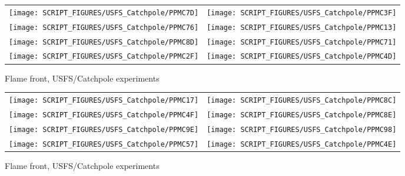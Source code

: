 \begin{figure}[p]
\begin{tabular*}{\textwidth}{l@{\extracolsep{\fill}}r}
\texttt{[image: SCRIPT\_FIGURES/USFS\_Catchpole/PPMC7D]} &
\texttt{[image: SCRIPT\_FIGURES/USFS\_Catchpole/PPMC3F]} \\
\texttt{[image: SCRIPT\_FIGURES/USFS\_Catchpole/PPMC76]} &
\texttt{[image: SCRIPT\_FIGURES/USFS\_Catchpole/PPMC13]} \\
\texttt{[image: SCRIPT\_FIGURES/USFS\_Catchpole/PPMC8D]} &
\texttt{[image: SCRIPT\_FIGURES/USFS\_Catchpole/PPMC71]} \\
\texttt{[image: SCRIPT\_FIGURES/USFS\_Catchpole/PPMC2F]} &
\texttt{[image: SCRIPT\_FIGURES/USFS\_Catchpole/PPMC4D]} \\
\end{tabular*}
\caption[Flame front, USFS/Catchpole experiments]{Flame front, USFS/Catchpole experiments}
\label{USFS_Catchpole_216}
\end{figure}


\begin{figure}[p]
\begin{tabular*}{\textwidth}{l@{\extracolsep{\fill}}r}
\texttt{[image: SCRIPT\_FIGURES/USFS\_Catchpole/PPMC17]} &
\texttt{[image: SCRIPT\_FIGURES/USFS\_Catchpole/PPMC8C]} \\
\texttt{[image: SCRIPT\_FIGURES/USFS\_Catchpole/PPMC4F]} &
\texttt{[image: SCRIPT\_FIGURES/USFS\_Catchpole/PPMC8E]} \\
\texttt{[image: SCRIPT\_FIGURES/USFS\_Catchpole/PPMC9E]} &
\texttt{[image: SCRIPT\_FIGURES/USFS\_Catchpole/PPMC98]} \\
\texttt{[image: SCRIPT\_FIGURES/USFS\_Catchpole/PPMC57]} &
\texttt{[image: SCRIPT\_FIGURES/USFS\_Catchpole/PPMC4E]} \\
\end{tabular*}
\caption[Flame front, USFS/Catchpole experiments]{Flame front, USFS/Catchpole experiments}
\label{USFS_Catchpole_224}
\end{figure}

